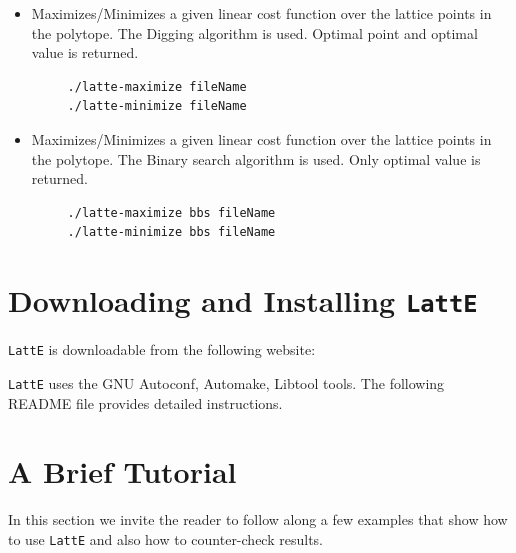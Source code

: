 \documentclass{article}
\newcommand{\latte}{{\tt LattE}\xspace}
\begin{document}
\begin{itemize}
\item Maximizes/Minimizes a given linear cost function over the lattice
  points in the polytope. The Digging algorithm
  \cite{latte3} is used. Optimal point and optimal value is returned. 
\begin{verbatim}
     ./latte-maximize fileName
     ./latte-minimize fileName
\end{verbatim} 
\item Maximizes/Minimizes a given linear cost function over the lattice
  points in the polytope. The Binary search
  algorithm is used. Only optimal value is returned. 
\begin{verbatim}
     ./latte-maximize bbs fileName
     ./latte-minimize bbs fileName
\end{verbatim} 
\end{itemize}




\section{Downloading and Installing {\tt LattE}}

{\tt LattE} is downloadable from the following website:



\latte uses the GNU Autoconf, Automake, Libtool tools. %
The following README file provides detailed instructions.

{\small}


\section{A Brief Tutorial}
In this section we invite the reader to follow along a few examples
that show how to use {\tt LattE} and also how to counter-check
results.
\end{document}
